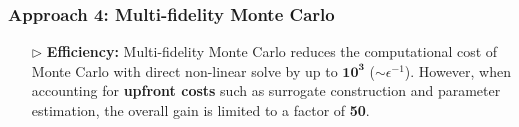 \documentclass{beamer}
\begin{document}
\begin{frame}[t]
    \frametitle{Approach 4: Multi-fidelity Monte Carlo}
\begin{itemize}[leftmargin=5pt] 
%

\item[$\triangleright$] \textcolor{myblue3}{\bf Efficiency:} {\footnotesize 
 Multi-fidelity Monte Carlo reduces the computational cost of Monte Carlo with direct non-linear solve by up to  $\boldsymbol{10^3}$ ($\sim \epsilon^{-1}$). However,  when accounting for {\bf upfront costs} such as surrogate construction and parameter estimation, the overall gain is limited to a factor of {\bf 50}.}
 \vspace{3mm}
\begin{figure}[ht!]\centering
{}
\label{fig:Experiment_result_plot}
\end{figure}

\end{itemize}
\end{frame}
\end{document}
